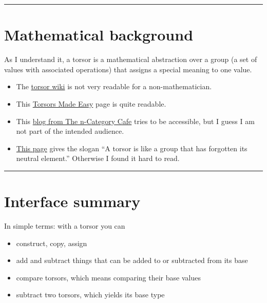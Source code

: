 \documentclass[]{article}
\providecommand{\tightlist}{%
  \setlength{\itemsep}{0pt}\setlength{\parskip}{0pt}}
\begin{document}
\begin{center}\rule{0.5\linewidth}{\linethickness}\end{center}

\hypertarget{mathematical-background}{%
\section{Mathematical background}\label{mathematical-background}}

As I understand it, a torsor is a mathematical abstraction over a group
(a set of values with associated operations) that assigns a special
meaning to one value.

\begin{itemize}
\item
  The
  \href{https://en.wikipedia.org/wiki/Torsor_(algebraic_geometry)}{torsor
  wiki} is not very readable for a non-mathematician.
\item
  This \href{http://math.ucr.edu/home/baez/torsors.html}{Torsors Made
  Easy} page is quite readable.
\item
  This
  \href{https://golem.ph.utexas.edu/category/2013/06/torsors_and_enriched_categorie.html}{blog
  from The n-Category Cafe} tries to be accessible, but I guess I am not
  part of the intended audience.
\item
  \href{https://ncatlab.org/nlab/show/torsor}{This page} gives the
  slogan ``A torsor is like a group that has forgotten its neutral
  element.'' Otherwise I found it hard to read.
\end{itemize}

\begin{center}\rule{0.5\linewidth}{\linethickness}\end{center}

\hypertarget{interface-summary}{%
\section{Interface summary}\label{interface-summary}}

In simple terms: with a torsor you can

\begin{itemize}
\tightlist
\item
  construct, copy, assign
\item
  add and subtract things that can be added to or subtracted from its
  base
\item
  compare torsors, which means comparing their base values
\item
  subtract two torsors, which yields its base type
\end{itemize}
\end{document}
